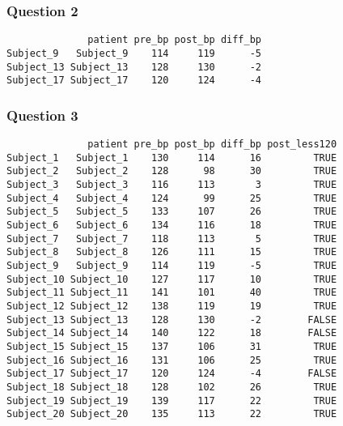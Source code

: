 \documentclass[
  letterpaper,
  DIV=11,
  numbers=noendperiod]{scrartcl}
\newenvironment{Shaded}{\begin{snugshade}}{\end{snugshade}}
\newcommand{\DecValTok}[1]{\textcolor[rgb]{0.68,0.00,0.00}{#1}}
\newcommand{\NormalTok}[1]{\textcolor[rgb]{0.00,0.23,0.31}{#1}}
\newcommand{\OtherTok}[1]{\textcolor[rgb]{0.00,0.23,0.31}{#1}}
\newcommand{\SpecialCharTok}[1]{\textcolor[rgb]{0.37,0.37,0.37}{#1}}
\begin{document}
\subsubsection{Question 2}\label{question-2-1}

\begin{Shaded}
\end{Shaded}

\begin{verbatim}
              patient pre_bp post_bp diff_bp
Subject_9   Subject_9    114     119      -5
Subject_13 Subject_13    128     130      -2
Subject_17 Subject_17    120     124      -4
\end{verbatim}

\subsubsection{Question 3}\label{question-3-1}

\begin{Shaded}
\end{Shaded}

\begin{verbatim}
              patient pre_bp post_bp diff_bp post_less120
Subject_1   Subject_1    130     114      16         TRUE
Subject_2   Subject_2    128      98      30         TRUE
Subject_3   Subject_3    116     113       3         TRUE
Subject_4   Subject_4    124      99      25         TRUE
Subject_5   Subject_5    133     107      26         TRUE
Subject_6   Subject_6    134     116      18         TRUE
Subject_7   Subject_7    118     113       5         TRUE
Subject_8   Subject_8    126     111      15         TRUE
Subject_9   Subject_9    114     119      -5         TRUE
Subject_10 Subject_10    127     117      10         TRUE
Subject_11 Subject_11    141     101      40         TRUE
Subject_12 Subject_12    138     119      19         TRUE
Subject_13 Subject_13    128     130      -2        FALSE
Subject_14 Subject_14    140     122      18        FALSE
Subject_15 Subject_15    137     106      31         TRUE
Subject_16 Subject_16    131     106      25         TRUE
Subject_17 Subject_17    120     124      -4        FALSE
Subject_18 Subject_18    128     102      26         TRUE
Subject_19 Subject_19    139     117      22         TRUE
Subject_20 Subject_20    135     113      22         TRUE
\end{verbatim}
\end{document}

